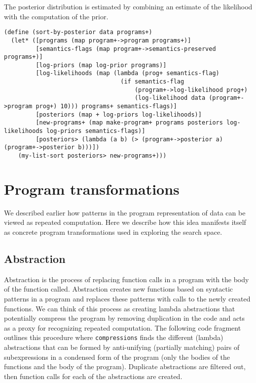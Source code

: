 \documentclass[a4paper,10pt]{article}
\begin{document}
The posterior distribution is estimated by combining an estimate of the likelihood with the computation of the prior.  
\begin{lstlisting}[frame=trbl]
(define (sort-by-posterior data programs+)
  (let* ([programs (map program+->program programs+)]
         [semantics-flags (map program+->semantics-preserved programs+)]
         [log-priors (map log-prior programs)]
         [log-likelihoods (map (lambda (prog+ semantics-flag)
                                 (if semantics-flag
                                     (program+->log-likelihood prog+)
                                     (log-likelihood data (program+->program prog+) 10))) programs+ semantics-flags)]
         [posteriors (map + log-priors log-likelihoods)] 
         [new-programs+ (map make-program+ programs posteriors log-likelihoods log-priors semantics-flags)]
         [posteriors> (lambda (a b) (> (program+->posterior a) (program+->posterior b)))])
    (my-list-sort posteriors> new-programs+)))
\end{lstlisting}


\newpage
\section{Program transformations}
We described earlier how patterns in the program representation of data can be viewed as repeated computation.  Here we describe how this idea manifests itself as concrete program transformations used in exploring the search space.

\subsection{Abstraction}
Abstraction is the process of replacing function calls in a program with the body of the function called. Abstraction creates new functions based on syntactic patterns in a program and replaces these patterns with calls to the newly created functions.  We can think of this process as creating lambda abstractions that potentially compress the program by removing duplication in the code and acts as a proxy for recognizing repeated computation.  The following code fragment outlines this procedure where \texttt{compressions} finds the different (lambda) abstractions that can be formed by anti-unifying (partially matching) pairs of subexpressions in a condensed form of the program (only the bodies of the functions and the body of the program).  Duplicate abstractions are filtered out, then function calls for each of the abstractions are created.
\end{document}
